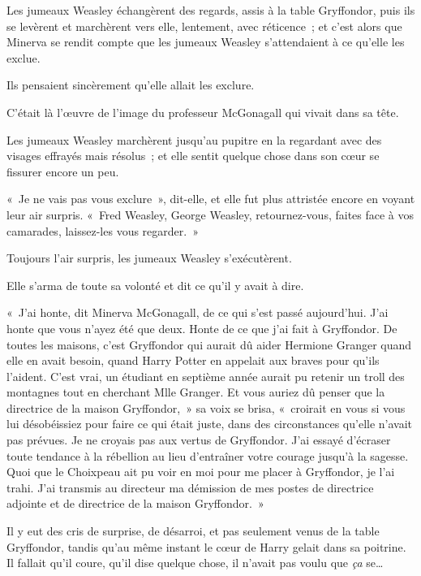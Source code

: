 Les jumeaux Weasley échangèrent des regards, assis à la table Gryffondor, puis ils se levèrent et marchèrent vers elle, lentement, avec réticence~; et c'est alors que Minerva se rendit compte que les jumeaux Weasley s'attendaient à ce qu'elle les exclue.

Ils pensaient sincèrement qu'elle allait les exclure.

C'était là l'œuvre de l'image du professeur McGonagall qui vivait dans sa tête.

Les jumeaux Weasley marchèrent jusqu'au pupitre en la regardant avec des visages effrayés mais résolus~; et elle sentit quelque chose dans son cœur se fissurer encore un peu.

«~Je ne vais pas vous exclure~», dit-elle, et elle fut plus attristée encore en voyant leur air surpris. «~Fred Weasley, George Weasley, retournez-vous, faites face à vos camarades, laissez-les vous regarder.~»

Toujours l'air surpris, les jumeaux Weasley s'exécutèrent.

Elle s'arma de toute sa volonté et dit ce qu'il y avait à dire.

«~J'ai honte, dit Minerva McGonagall, de ce qui s'est passé aujourd'hui. J'ai honte que vous n'ayez été que deux. Honte de ce que j'ai fait à Gryffondor. De toutes les maisons, c'est Gryffondor qui aurait dû aider Hermione Granger quand elle en avait besoin, quand Harry Potter en appelait aux braves pour qu'ils l'aident. C'est vrai, un étudiant en septième année aurait pu retenir un troll des montagnes tout en cherchant Mlle Granger. Et vous auriez dû penser que la directrice de la maison Gryffondor,~» sa voix se brisa, «~croirait en vous si vous lui désobéissiez pour faire ce qui était juste, dans des circonstances qu'elle n'avait pas prévues. Je ne croyais pas aux vertus de Gryffondor. J'ai essayé d'écraser toute tendance à la rébellion au lieu d'entraîner votre courage jusqu'à la sagesse. Quoi que le Choixpeau ait pu voir en moi pour me placer à Gryffondor, je l'ai trahi. J'ai transmis au directeur ma démission de mes postes de directrice adjointe et de directrice de la maison Gryffondor.~»

\later

Il y eut des cris de surprise, de désarroi, et pas seulement venus de la table Gryffondor, tandis qu'au même instant le cœur de Harry gelait dans sa poitrine. Il fallait qu'il coure, qu'il dise quelque chose, il n'avait pas voulu que \emph{ça} se…

\later

